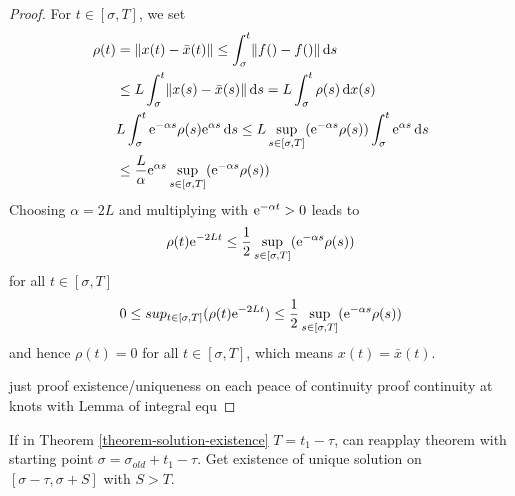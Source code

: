 \begin{proof}
    For $t\in [\sigma,T]$, we set
    \begin{align*}
        \rho(t) &= \nnorm{x(t)-\bar{x}(t)} \leq \int_\sigma^t \nnorm{f()-f()}\dx[s]\\
        & \leq L \int_\sigma^t \nnorm{x(s)-\bar{x}(s)}\dx[s] = L \int_\sigma^t \rho(s)\dx(s)\\
        & L \int_\sigma^t \e{-\alpha s}\rho(s)\e{\alpha s}\dx[s] \leq L \sup_{s\in [\sigma,T]}(\e{-\alpha s}\rho(s))\int_\sigma^t \e{\alpha s}\dx[s]\\
        & \leq\frac{L}{\alpha}\e{\alpha s} \sup_{s\in [\sigma,T]}(\e{-\alpha s}\rho(s))
    \end{align*}
    Choosing $\alpha=2L$ and multiplying with $\e{-\alpha t}>0$ leads to
    \begin{equation}
        \rho(t)\e{-2Lt} \leq \frac{1}{2}\sup_{s\in [\sigma,T]}(\e{-\alpha s}\rho(s))
    \end{equation}
    for all $t\in [\sigma,T]$
    \begin{equation}
        0 \leq sup_{t\in [\sigma,T]}(\rho(t)\e{-2Lt}) \leq \frac{1}{2}\sup_{s\in [\sigma,T]}(\e{-\alpha s}\rho(s))
    \end{equation}
    and hence $\rho(t)=0$ for all $t\in [\sigma,T]$, which means $x(t)=\bar{x}(t)$.

    just proof existence/uniqueness on each peace of continuity proof continuity at knots with Lemma of integral equ

\end{proof}


\begin{corollary}
    \label{cor:continuability-of-solution}

    If in Theorem \ref{theorem-solution-existence} $T=t_1-\tau$, can reapplay theorem with starting point $\sigma=\sigma_{old}+t_1-\tau$. Get existence of unique solution on $[\sigma-\tau,\sigma+S]$ with $S>T$.
\end{corollary}

